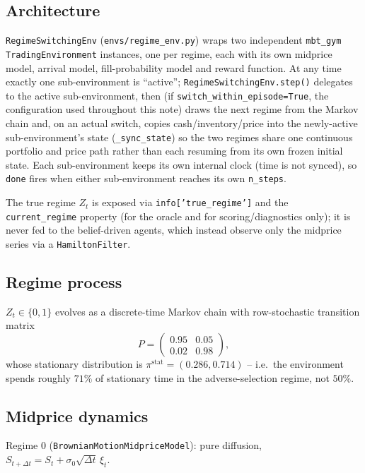 \documentclass[11pt]{article}
\begin{document}
\subsection{Architecture}
\texttt{RegimeSwitchingEnv} (\texttt{envs/regime\_env.py}) wraps two independent \texttt{mbt\_gym} \texttt{TradingEnvironment} instances, one per regime, each with its own midprice model, arrival model, fill-probability model and reward function. At any time exactly one sub-environment is ``active''; \texttt{RegimeSwitchingEnv.step()} delegates to the active sub-environment, then (if \texttt{switch\_within\_episode=True}, the configuration used throughout this note) draws the next regime from the Markov chain and, on an actual switch, copies cash/inventory/price into the newly-active sub-environment's state (\texttt{\_sync\_state}) so the two regimes share one continuous portfolio and price path rather than each resuming from its own frozen initial state. Each sub-environment keeps its own internal clock (time is not synced), so \texttt{done} fires when either sub-environment reaches its own \texttt{n\_steps}.

The true regime $Z_t$ is exposed via \texttt{info['true\_regime']} and the \texttt{current\_regime} property (for the oracle and for scoring/diagnostics only); it is never fed to the belief-driven agents, which instead observe only the midprice series via a \texttt{HamiltonFilter}.

\subsection{Regime process}
$Z_t \in \{0,1\}$ evolves as a discrete-time Markov chain with row-stochastic transition matrix
\begin{equation}
P = \begin{pmatrix} 0.95 & 0.05 \\ 0.02 & 0.98 \end{pmatrix},
\label{eq:sys-P}
\end{equation}
whose stationary distribution is $\pi^{\text{stat}} = (0.286, 0.714)$ -- i.e.\ the environment spends roughly $71\%$ of stationary time in the adverse-selection regime, not $50\%$.

\subsection{Midprice dynamics}
Regime 0 (\texttt{BrownianMotionMidpriceModel}): pure diffusion, $S_{t+\Delta t} = S_t + \sigma_0 \sqrt{\Delta t}\,\xi_t$.
\end{document}

